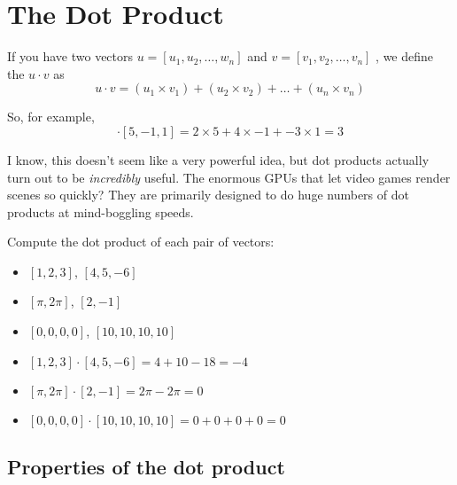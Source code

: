 \chapter{The Dot Product}

If you have two vectors $u = [u_1, u_2, \dots, w_n]$ and $v = [v_1, v_2,\dots, v_n]$ , 
we define the  $u \cdot v$ as 
\begin{equation*}
     u \cdot v = (u_1 \times v_1) + (u_2 \times v_2) + \dots + (u_n \times v_n)
\end{equation*} 

So, for example, 
\begin{equation*}
    [2,4, -3] \cdot [5, -1, 1] = 2 \times 5 + 4 \times -1 + -3 \times 1 = 3
\end{equation*}

I know, this doesn't seem like a very powerful idea, but dot products actually turn out to 
be \emph{incredibly} useful.  The enormous GPUs that let video games render scenes so quickly? 
They are primarily designed to do huge numbers of dot products at mind-boggling speeds. 

\begin{Exercise}[title={Basic dot products}, label=dot_products]
    Compute the dot product of each pair of vectors:
    \begin{itemize}
        \item $[1, 2, 3]$, $[4, 5, -6]$
        \item $[\pi, 2\pi]$, $[2, -1]$
        \item $[0,0,0,0]$, $[10,10,10,10]$
    \end{itemize}
\end{Exercise}
\begin{Answer}[ref=dot_products]
        \begin{itemize}
            \item $[1, 2, 3] \cdot [4, 5, -6] = 4 + 10 - 18 = -4$
            \item $[\pi, 2\pi] \cdot [2, -1] = 2\pi - 2\pi = 0$
            \item $[0,0,0,0] \cdot [10,10,10,10] = 0 + 0 + 0 + 0 = 0$ 
        \end{itemize}
\end{Answer}

\section{Properties of the dot product}

